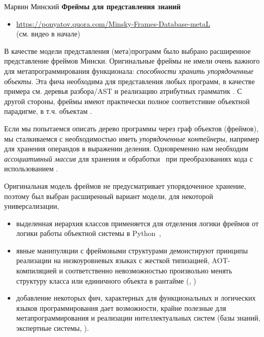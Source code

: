 \label{frame}\secdown


\cite{minsky} Марвин Минский \textbf{Фреймы для представления знаний}
\bigskip

\begin{itemize}
  \item 
\url{https://ponyatov.quora.com/Minsky-Frames-Database-metaL}\\(см. видео в
начале)
\end{itemize}

В качестве модели представления (мета)программ было выбрано расширенное
представление фреймов Мински. Оригинальные фреймы не имели очень важного для
метапрограммирования функционала: \textit{способности хранить упорядоченные
объекты}. Эта фича необходима для представления любых
программ, в качестве примера см. деревья разбора/AST и реализацию атрибутных
грамматик \cite{dragon2}. С другой стороны, фреймы имеют практически полное
соответстивие объектной парадигме, в т.ч. объектам \py.

Если мы попытаемся описать дерево программы через граф объектов (фреймов), мы
сталкиваемся с необходимостью иметь \emph{упорядоченные контейнеры}, например
для хранения операндов в выражении деления. Одновременно нам необходим
\emph{ассоциативный массив} для хранения и обработки \ при
преобразованиях кода с использованием .

Оригинальная модель фреймов не предусматривает упорядоченное хранение, поэтому
был выбран расширенный вариант модели, для некоторой универсализации,
\begin{itemize}
  \item 
выделенная иерархия классов применяется для отделения логики фреймов от логики
работы объектной системы в Python\ ,
  \item 
явные манипуляции с фреймовыми структурами демонстируют принципы реализации на
низкоуровневых языках с жесткой типизацией, AOT-компиляцией и соответственно
невозможностью произвольно менять структуру класса или единичного объекта в
рантайме (\cpp, \java)
  \item 
добавление некоторых фич, характерных для функциональных и логических языков 
программирования 
дает возможности, крайне полезные для метапрограммирования и реализации
интеллектуальных систем (базы знаний, экспертные системы, ).
\end{itemize}

